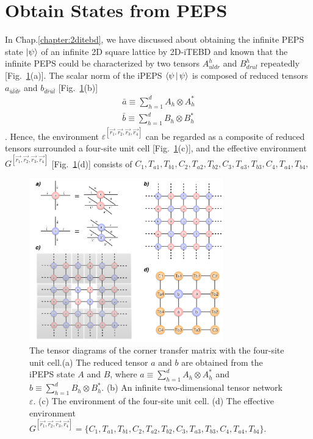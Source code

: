 \section{Obtain States from PEPS}
\label{2ditebdctm}
In Chap.\ref{chapter:2ditebd}, we have discussed about obtaining the infinite PEPS state $\Ket{\psi}$ of an infinite 2D square lattice by 2D-iTEBD and known that the infinite PEPS could be characterized by two tensors $A^h_{uldr}$ and $B^h_{drul}$ repeatedly [Fig.~\ref{fig511}(a)]. The scalar norm of the iPEPS $\Braket{\psi|\psi}$ is composed of reduced tensors $a_{\bar{u}\bar{l}\bar{d}\bar{r}}$ and $b_{\bar{d}\bar{r}\bar{u}\bar{l}}$ [Fig.~\ref{fig511}(b)]
\begin{align}
	\bar{a} \equiv \sum_{h=1}^{d} A_{h} \otimes A^{*}_{h} \\
	\label{reduce_b}
	\bar{b} \equiv \sum_{h=1}^{d} B_{h} \otimes B^{*}_{h}
\end{align}.
Hence, the environment $\varepsilon^{\left[\vec{r_1},\vec{r_2},\vec{r_3},\vec{r_4}\right]}$ can be regarded as a composite of reduced tensors surrounded a four-site unit cell [Fig.~\ref{fig511}(c)], and the effective environment $G^{\left[\vec{r_1},\vec{r_2},\vec{r_3},\vec{r_4}\right]}$ [Fig.~\ref{fig511}(d)] consists of $C_1, T_{a1}, T_{b1},C_2, T_{a2}, T_{b2},C_3, T_{a3}, T_{b3},C_4, T_{a4}, T_{b4},$

\begin{figure}[ht]
	\centering
	\includegraphics[width=0.75\textwidth]{figures/fig511.png}
	\caption[The tensor diagrams of the corner transfer matrix with the four-site unit cell.]{The tensor diagrams of the corner transfer matrix with the four-site unit cell.(a) The reduced tensor $a$ and $b$ are obtained from the iPEPS state $A$ and $B$, where $a \equiv \sum_{h=1}^{d} A_{h} \otimes A^{*}_{h}$ and $b \equiv \sum_{h=1}^{d} B_{h} \otimes B^{*}_{h}$. (b) An infinite two-dimensional tensor network $\varepsilon$. (c) The environment of the four-site unit cell. (d) The effective environment $G^{\left[\vec{r_1},\vec{r_2},\vec{r_3},\vec{r_4}\right]} = \{ C_1, T_{a1}, T_{b1},C_2, T_{a2}, T_{b2},C_3, T_{a3}, T_{b3},C_4, T_{a4}, T_{b4}\}$.}
	\label{fig511}
\end{figure}

